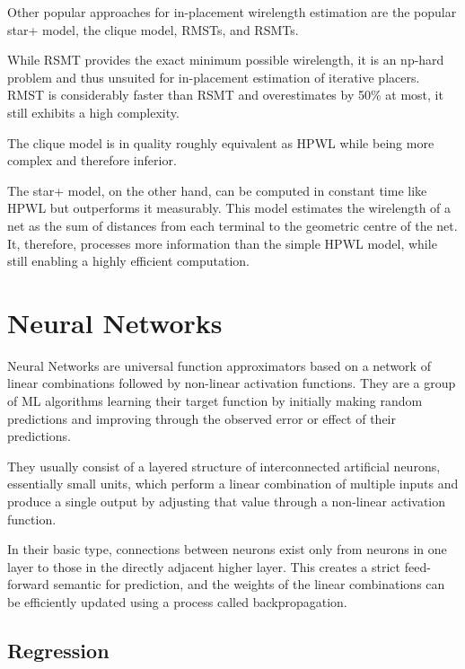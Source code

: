 Other popular approaches for in-placement wirelength estimation are the popular star+ model, the clique model, \glspl{RMST}, and \glspl{RSMT}.\cite{star-plus-paper}

While \gls{RSMT} provides the exact minimum possible wirelength, it is an np-hard problem and thus unsuited for in-placement estimation of iterative placers. \gls{RMST} is considerably faster than \gls{RSMT} and overestimates by 50\% at most\cite{rmst-quality}, it still exhibits a high complexity.

The clique model is in quality roughly equivalent as \gls{HPWL}\cite{star-plus-paper} while being more complex and therefore inferior.

The star+ model, on the other hand, can be computed in constant time like \gls{HPWL} but outperforms it measurably. This model estimates the wirelength of a net as the sum of distances from each terminal to the geometric centre of the net. It, therefore, processes more information than the simple \gls{HPWL} model, while still enabling a highly efficient computation.\cite{star-plus-paper}

\section{Neural Networks}

Neural Networks are universal function approximators based on a network of linear combinations followed by non-linear activation functions. They are a group of \gls{ML} algorithms learning their target function by initially making random predictions and improving through the observed error or effect of their predictions.

They usually consist of a layered structure of interconnected artificial neurons, essentially small units, which perform a linear combination of multiple inputs and produce a single output by adjusting that value through a non-linear activation function.

In their basic type, connections between neurons exist only from neurons in one layer to those in the directly adjacent higher layer. This creates a strict feed-forward semantic for prediction, and the weights of the linear combinations can be efficiently updated using a process called backpropagation.

\subsection{Regression}

